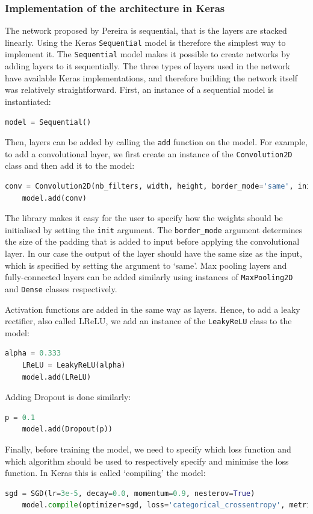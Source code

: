 \documentclass[12pt,a4paper,twoside,openright]{report}
\begin{document}
\subsubsection{Implementation of the architecture in Keras}
The network proposed by Pereira is sequential, that is the layers are stacked linearly. Using the Keras \texttt{Sequential} model is therefore the simplest way to implement it. The \texttt{Sequential} model makes it possible to create networks by adding layers to it sequentially. The three types of layers used in the network have available Keras implementations, and therefore building the network itself was relatively straightforward. First, an instance of a sequential model is instantiated:
\begin{lstlisting}[style=python, language=Python]
	model = Sequential()
\end{lstlisting}
Then, layers can be added by calling the \texttt{add} function on the model. For example, to add a convolutional layer, we first create an instance of the \texttt{Convolution2D} class and then add it to the model:
\begin{lstlisting}[style=python, language=Python]
	conv = Convolution2D(nb_filters, width, height, border_mode='same', init='glorot_normal')
	model.add(conv)
\end{lstlisting}
The library makes it easy for the user to specify how the weights should be initialised by setting the \texttt{init} argument. The \texttt{border\_mode} argument determines the size of the padding that is added to input before applying the convolutional layer. In our case the output of the layer should have the same size as the input, which is specified by setting the argument to `same'. Max pooling layers and fully-connected layers can be added similarly using instances of \texttt{MaxPooling2D} and \texttt{Dense} classes respectively.

Activation functions are added in the same way as layers. Hence, to add a leaky rectifier, also called LReLU, we add an instance of the \texttt{LeakyReLU} class to the model:
\begin{lstlisting}[style=python, language=Python]
	alpha = 0.333
	LReLU = LeakyReLU(alpha)
	model.add(LReLU)
\end{lstlisting}
Adding Dropout is done similarly:
\begin{lstlisting}[style=python, language=Python]
	p = 0.1
	model.add(Dropout(p))
\end{lstlisting}

Finally, before training the model, we need to specify which loss function and which algorithm should be used to respectively specify and minimise the loss function. In Keras this is called `compiling' the model:
\begin{lstlisting}[style=python, language=Python]
	sgd = SGD(lr=3e-5, decay=0.0, momentum=0.9, nesterov=True)
	model.compile(optimizer=sgd, loss='categorical_crossentropy', metrics=['accuracy']
\end{lstlisting}
\end{document}
